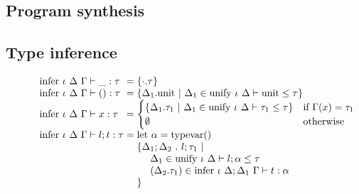 \documentclass[sigplan,screen]{acmart}
\begin{document}
\subsection{Program synthesis}
\subsection{Type inference}

\begin{figure*}[h]
  \[
    \begin{array}{l @{} l}
      \text{infer } \iota\ \Delta\ \Gamma \vdash 
      \_ : \tau
      &{} =
      \{\cdot.\tau\}
      \\

      \text{infer } \iota\ \Delta\ \Gamma \vdash 
      () : \tau
      &{} =
      \begin{array}[t]{@{} l}
        \{\Delta_1.\text{unit}\ |
        \ \Delta_1 \in \text{unify } \iota\ \Delta \vdash \text{unit} \leq \tau
        \}
      \end{array}
      \\

      \text{infer } \iota\ \Delta\ \Gamma \vdash 
      x : \tau
      &{} =
      \begin{cases}  
        \{\Delta_1.\tau_1\ |
        \ \Delta_1 \in \text{unify } \iota\ \Delta \vdash \tau_1 \leq \tau
        \}
        &\text{if } \Gamma(x) = \tau_1
        \\
        \emptyset
        &\text{otherwise}
      \end{cases}
      \\

      \text{infer } \iota\ \Delta\ \Gamma \vdash 
      l ; t : \tau
      &{} =
      \begin{array}[t]{@{} l}
        \text{let } \alpha = \text{typevar}() 
        \\
        \{\Delta_1;\Delta_2\ .\ l ; \tau_1 \ |
        \\
        \ \ \ \ \Delta_1 \in \text{unify } \iota\ \Delta \vdash l ; \alpha \leq \tau
        \\
        \ \ \ \ (\Delta_2.\tau_1) \in \text{infer } \iota\ \Delta;\Delta_1\ \Gamma \vdash t : \alpha
        \\
        \}
      \end{array}
      \\


\end{array}\]
\end{figure*}
\end{document}
